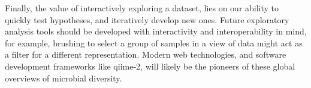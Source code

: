 Finally, the value of interactively exploring a dataset, lies on our ability to 
quickly test hypotheses, and iteratively develop new ones. Future exploratory 
analysis tools should be developed with interactivity and interoperability in 
mind, for example, brushing to select a group of samples in a view of data 
might act as a filter for a different representation. Modern web technologies, 
and software development frameworks like \gls{qiime}-2, will likely be the 
pioneers of these global overviews of microbial diversity.
